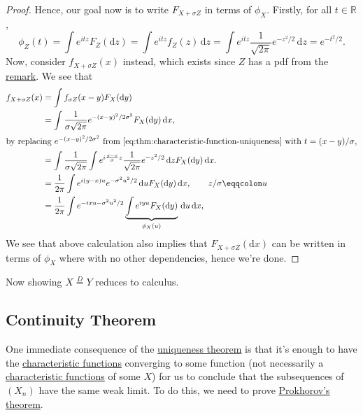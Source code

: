 \begin{proof}
	Hence, our goal now is to write \(F_{X + \sigma Z}\) in terms of \(\phi _X\). Firstly, for all \(t\in \mathbb{R} \),
	\begin{equation}\label{eq:thm:characteristic-function-uniqueness}
		\phi _Z(t)
		= \int e^{i t z} F_Z(\mathrm{d} z)
		= \int e^{i t z} f_Z(z) \,\mathrm{d} z
		= \int e^{i t z} \frac{1}{\sqrt{2\pi } } e^{-z^2 / 2} \,\mathrm{d} z
		= e^{-t^2 / 2}.
	\end{equation}
	Now, consider \(f_{X + \sigma Z}(x)\) instead, which exists since \(Z\) has a pdf from the \hyperref[rmk:lec8]{remark}. We see that
	\begin{align*}
		f_{X + \sigma Z}(x)
		 & = \int f_{\sigma Z}(x-y) F_{X}(\mathrm{d} y) \tag*{}                                                                                                              \\
		 & = \int \frac{1}{\sigma \sqrt{2 \pi } } e^{- (x-y)^2 / 2\sigma ^2} F_X(\mathrm{d} y) \,\mathrm{d} x ,                                                              \\
		\shortintertext{by replacing \(e^{-(x-y)^2 / 2\sigma ^2}\) from \autoref{eq:thm:characteristic-function-uniqueness} with \(t = (x - y) / \sigma \),}
		 & = \int \frac{1}{\sigma \sqrt{2\pi } } \int e^{i \frac{y - x}{\sigma } z} \frac{1}{\sqrt{2\pi } }  e^{- z^2 / 2} \,\mathrm{d} z F_X(\mathrm{d} y) \,\mathrm{d} x . \\
		 & =\frac{1}{2\pi } \int e^{i (y - x) u} e^{- \sigma ^2 u^2 / 2} \,\mathrm{d} u F_X(\mathrm{d} y) \,\mathrm{d} x , \tag*{\(z / \sigma \eqqcolon u\)}                 \\
		 & = \frac{1}{2\pi } \int e^{-i x u - \sigma ^2 u^2 / 2} \underbrace{\int e^{i y u} F_X(\mathrm{d} y)}_{\phi _X(u)} \,\mathrm{d} u \,\mathrm{d} x ,
	\end{align*}
	We see that above calculation also implies that \(F_{X + \sigma Z} (\mathrm{d} x)\) can be written in terms of \(\phi _X\) where with no other dependencies, hence we're done.
\end{proof}

\begin{note}
	Now showing \(X \overset{D}{=} Y\) reduces to calculus.
\end{note}

\subsection{Continuity Theorem}
One immediate consequence of the \hyperref[thm:characteristic-function-uniqueness]{uniqueness theorem} is that it's enough to have the \hyperref[def:characteristic-function]{characteristic functions} converging to some function (not necessarily a \hyperref[def:characteristic-function]{characteristic functions} of some \(X\)) for us to conclude that the subsequences of \((X_n)\) have the same weak limit. To do this, we need to prove \hyperref[thm:Prokhorov]{Prokhorov's theorem}.

